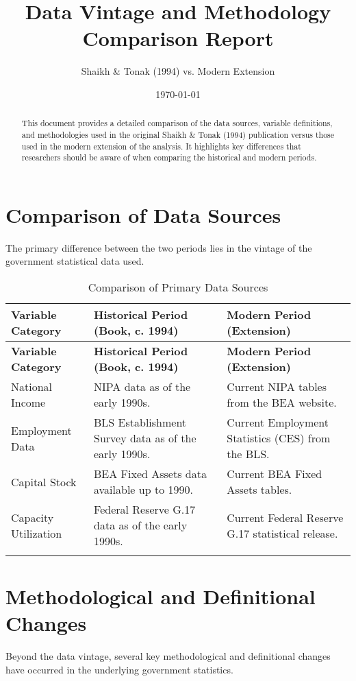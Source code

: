 \documentclass[12pt,a4paper]{article}
\title{Data Vintage and Methodology Comparison Report}
\author{Shaikh \& Tonak (1994) vs. Modern Extension}
\date{\today}
\begin{document}
\maketitle

\begin{abstract}
This document provides a detailed comparison of the data sources, variable definitions, and methodologies used in the original Shaikh \& Tonak (1994) publication versus those used in the modern extension of the analysis. It highlights key differences that researchers should be aware of when comparing the historical and modern periods.
\end{abstract}

\section{Comparison of Data Sources}
The primary difference between the two periods lies in the vintage of the government statistical data used.

\begin{longtable}{lll}
\toprule
\textbf{Variable Category} & \textbf{Historical Period (Book, c. 1994)} & \textbf{Modern Period (Extension)} \\
\midrule
\endfirsthead
\toprule
\textbf{Variable Category} & \textbf{Historical Period (Book, c. 1994)} & \textbf{Modern Period (Extension)} \\
\midrule
\endhead
National Income & NIPA data as of the early 1990s. & Current NIPA tables from the BEA website. \\
Employment Data & BLS Establishment Survey data as of the early 1990s. & Current Employment Statistics (CES) from the BLS. \\
Capital Stock & BEA Fixed Assets data available up to 1990. & Current BEA Fixed Assets tables. \\
Capacity Utilization & Federal Reserve G.17 data as of the early 1990s. & Current Federal Reserve G.17 statistical release. \\
\bottomrule
\caption{Comparison of Primary Data Sources}
\label{tab:data_sources}
\end{longtable}

\section{Methodological and Definitional Changes}
Beyond the data vintage, several key methodological and definitional changes have occurred in the underlying government statistics.
\end{document}
